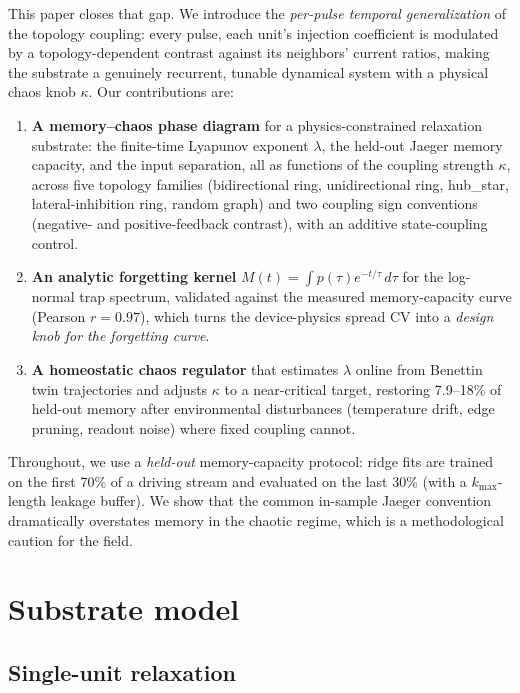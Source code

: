 \documentclass[11pt]{article}
\begin{document}
This paper closes that gap. We introduce the \emph{per-pulse temporal
generalization} of the topology coupling: every pulse, each unit's injection
coefficient is modulated by a topology-dependent contrast against its
neighbors' current ratios, making the substrate a genuinely recurrent, tunable
dynamical system with a physical chaos knob $\kappa$. Our contributions are:
\begin{enumerate}
\item \textbf{A memory--chaos phase diagram} for a physics-constrained
relaxation substrate: the finite-time Lyapunov exponent $\lambda$, the held-out
Jaeger memory capacity, and the input separation, all as functions of the
coupling strength $\kappa$, across five topology families (bidirectional ring,
unidirectional ring, hub\_star, lateral-inhibition ring, random graph) and
two coupling sign conventions (negative- and positive-feedback contrast), with
an additive state-coupling control.
\item \textbf{An analytic forgetting kernel} $M(t)=\int p(\tau)e^{-t/\tau}
\,d\tau$ for the log-normal trap spectrum, validated against the measured
memory-capacity curve (Pearson $r=0.97$), which turns the device-physics spread
CV into a \emph{design knob for the forgetting curve}.
\item \textbf{A homeostatic chaos regulator} that estimates $\lambda$ online
from Benettin twin trajectories and adjusts $\kappa$ to a near-critical target,
restoring 7.9--18\% of held-out memory after environmental disturbances
(temperature drift, edge pruning, readout noise) where fixed coupling cannot.
\end{enumerate}

Throughout, we use a \emph{held-out} memory-capacity protocol: ridge fits are
trained on the first 70\% of a driving stream and evaluated on the last 30\%
(with a $k_{\max}$-length leakage buffer). We show that the common in-sample
Jaeger convention dramatically overstates memory in the chaotic regime, which
is a methodological caution for the field.

\section{Substrate model}
\label{sec:model}

\subsection{Single-unit relaxation}
\end{document}
